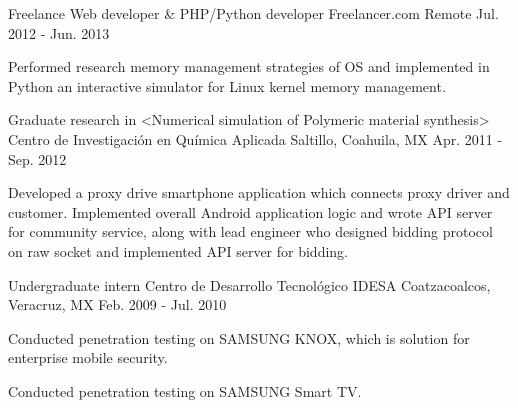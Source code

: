 \begin{cventries}

\cventry
{Freelance Web developer \& PHP/Python developer} %
{Freelancer.com} %
{Remote} %
{Jul. 2012 - Jun. 2013} %
{ %
	\begin{cvitems}
	\item {Performed research memory management strategies of OS and implemented in Python an interactive simulator for Linux kernel memory management.}
	\end{cvitems}
}


\cventry
{Graduate research in <Numerical simulation of Polymeric material synthesis>} %
{Centro de Investigación en Química Aplicada} %
{Saltillo, Coahuila, MX} %
{Apr. 2011 - Sep. 2012} %
{ %
	\begin{cvitems}
	\item {Developed a proxy drive smartphone application which connects proxy driver and customer. Implemented overall Android application logic and wrote API server for community service, along with lead engineer who designed bidding protocol on raw socket and implemented API server for bidding.}
	\end{cvitems}
}


\cventry
{Undergraduate intern} %
{Centro de Desarrollo Tecnológico IDESA} %
{Coatzacoalcos, Veracruz, MX} %
{Feb. 2009 - Jul. 2010} %
{ %
\begin{cvitems}
\item {Conducted penetration testing on SAMSUNG KNOX, which is solution for enterprise mobile security.}
\item {Conducted penetration testing on SAMSUNG Smart TV.}
\end{cvitems}
}


\end{cventries}